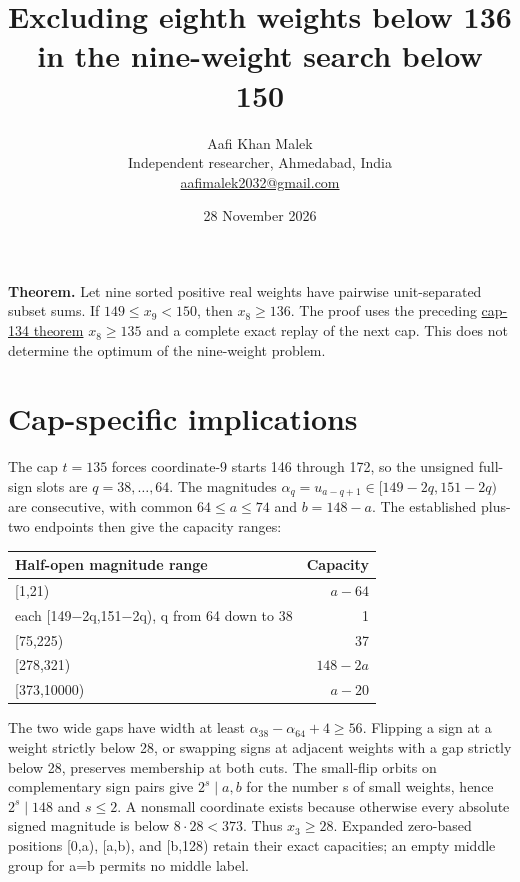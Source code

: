 \documentclass[11pt,letterpaper]{article}
\title{Excluding eighth weights below 136 in the nine-weight search below 150}
\author{Aafi Khan Malek\\ \small Independent researcher, Ahmedabad, India\\
\small\href{mailto:aafimalek2032@gmail.com}{aafimalek2032@gmail.com}}
\date{28 November 2026}
\begin{document}
\maketitle
\textbf{Theorem.} Let nine sorted positive real weights have pairwise
unit-separated subset sums. If \(149\le x_9<150\), then \(x_8\ge 136\).
The proof uses the preceding
\href{https://github.com/Aafimalek/novel-discoveries/tree/2d9416dca07cce2d85ba973076b788761f392f53/nine-separated-subset-sums/verification/rank-cuts-below-150/penultimate-cap-134}{cap-134 theorem} \(x_8\ge 135\) and a complete exact
replay of the next cap. This does not determine the optimum of the
nine-weight problem.

\section{Cap-specific implications}\label{cap-specific-implications}

The cap \(t=135\) forces coordinate-9 starts 146 through 172, so the
unsigned full-sign slots are \(q=38,\dots,64\). The magnitudes
\(\alpha_q=u_{a-q+1}\in[149-2q,151-2q)\) are consecutive, with common
\(64\le a\le74\) and \(b=148-a\). The established plus-two endpoints
then give the capacity ranges:

\begin{longtable}[]{@{}lr@{}}
\toprule\noalign{}
Half-open magnitude range & Capacity \\
\midrule\noalign{}
\endhead
\bottomrule\noalign{}
\endlastfoot
{[}1,21) & \(a-64\) \\
each {[}149−2q,151−2q), q from 64 down to 38 & 1 \\
{[}75,225) & 37 \\
{[}278,321) & \(148-2a\) \\
{[}373,10000) & \(a-20\) \\
\end{longtable}

The two wide gaps have width at least
\(\alpha_{38}-\alpha_{64}+4\ge56\). Flipping a sign at a weight strictly
below 28, or swapping signs at adjacent weights with a gap strictly
below 28, preserves membership at both cuts. The small-flip orbits on
complementary sign pairs give \(2^s\mid a,b\) for the number s of small
weights, hence \(2^s\mid148\) and \(s\le2\). A nonsmall coordinate
exists because otherwise every absolute signed magnitude is below
\(8\cdot28<373\). Thus \(x_3\ge28\). Expanded zero-based positions
{[}0,a), {[}a,b), and {[}b,128) retain their exact capacities; an empty
middle group for a=b permits no middle label.
\end{document}
